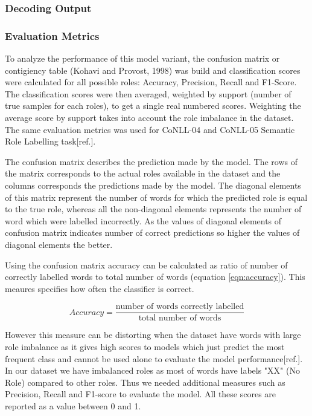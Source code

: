 \subsubsection{Decoding Output}



\subsubsection{Evaluation Metrics}

To analyze the performance of this model variant, the confusion matrix or contigiency table (Kohavi and Provost, 1998) was build and classification scores were calculated for all possible roles: Accuracy, Precision, Recall and F1-Score. The classification scores were then averaged, weighted by support (number of true samples for each roles), to get a single real numbered scores. Weighting the average score by support takes into account the role imbalance in the dataset. The same evaluation metrics was used for CoNLL-04 and CoNLL-05 Semantic Role Labelling task[ref.].


The confusion matrix describes the prediction made by the model. The rows of the matrix corresponds to the actual roles available in the dataset and the columns corresponds the predictions made by the model. The diagonal elements of this matrix represent the number of words for which the predicted role is equal to the true role,  whereas all the non-diagonal elements represents the number of word which were labelled incorrectly. As the values of diagonal elements of confusion matrix indicates number of correct predictions so higher the values of diagonal elements the better.

Using the confusion matrix accuracy can be calculated as ratio of number of correctly labelled words to total number of words (equation \ref{eqn:accuracy}). This meaures specifies how often the classifier is correct. 

\begin{equation}\label{eqn:accuracy}
Accuracy= \frac{\text{number of words correctly labelled}}{\text{total number of words}}
\end{equation}
 
However this measure can be distorting when the  dataset have words with large role imbalance as it gives high scores to models which just predict the most frequent class and cannot be used alone to evaluate the model performance[ref.]. In our dataset we have imbalanced roles as most of words have labels "XX" (No Role) compared to other roles. Thus we needed additional measures such as Precision, Recall and F1-score to evaluate the model. All these scores are reported as a value between 0 and 1. 

